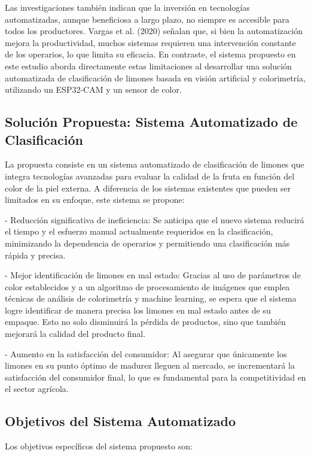Las investigaciones también indican que la inversión en tecnologías automatizadas, aunque beneficiosa a largo plazo, no siempre es accesible para todos los productores. Vargas et al. (2020) señalan que, si bien la automatización mejora la productividad, muchos sistemas requieren una intervención constante de los operarios, lo que limita su eficacia. En contraste, el sistema propuesto en este estudio aborda directamente estas limitaciones al desarrollar una solución automatizada de clasificación de limones basada en visión artificial y colorimetría, utilizando un ESP32-CAM y un sensor de color.

\subsection{Solución Propuesta: Sistema Automatizado de Clasificación}

La propuesta consiste en un sistema automatizado de clasificación de limones que integra tecnologías avanzadas para evaluar la calidad de la fruta en función del color de la piel externa. A diferencia de los sistemas existentes que pueden ser limitados en su enfoque, este sistema se propone:

- Reducción significativa de ineficiencia: Se anticipa que el nuevo sistema reducirá el tiempo y el esfuerzo manual actualmente requeridos en la clasificación, minimizando la dependencia de operarios y permitiendo una clasificación más rápida y precisa.
  
- Mejor identificación de limones en mal estado: Gracias al uso de parámetros de color establecidos y a un algoritmo de procesamiento de imágenes que emplea técnicas de análisis de colorimetría y machine learning, se espera que el sistema logre identificar de manera precisa los limones en mal estado antes de su empaque. Esto no solo disminuirá la pérdida de productos, sino que también mejorará la calidad del producto final.

- Aumento en la satisfacción del consumidor: Al asegurar que únicamente los limones en su punto óptimo de madurez lleguen al mercado, se incrementará la satisfacción del consumidor final, lo que es fundamental para la competitividad en el sector agrícola.

\subsection{Objetivos del Sistema Automatizado}

Los objetivos específicos del sistema propuesto son:

